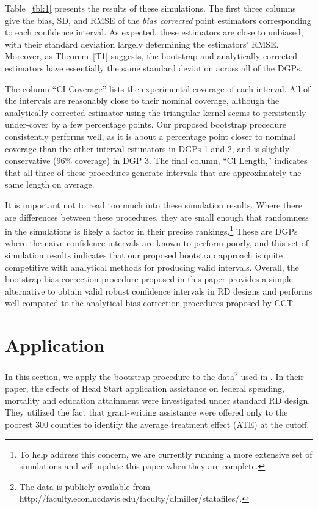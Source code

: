 \documentclass[12pt,fleqn]{article}
\begin{document}
Table~\ref{tbl:1} presents the results of these simulations. The first three
columns give the bias, SD, and RMSE of the \emph{bias corrected} point
estimators corresponding to each confidence interval.  As expected, these
estimators are close to unbiased, with their standard deviation largely
determining the estimators' RMSE. Moreover, as Theorem~\ref{T1} suggests, the
bootstrap and analytically-corrected estimators have essentially the same
standard deviation across all of the DGPs.

The column ``CI Coverage'' lists the experimental coverage of each interval.
All of the intervals are reasonably close to their nominal coverage, although
the analytically corrected estimator using the triangular kernel seems to
persistently under-cover by a few percentage points. Our proposed bootstrap
procedure consistently performs well, as it is about a percentage point closer
to nominal coverage than the other interval estimators in DGPs 1 and 2, and is
slightly conservative (96\% coverage) in DGP 3. The final column, ``CI Length,''
indicates that all three of these procedures generate intervals that are
approximately the same length on average.

It is important not to read too much into these simulation results. Where there
are differences between these procedures, they are small enough that randomness
in the simulations is likely a factor in their precise rankings.\footnote{%
  To help address this concern, we are currently running a more extensive set of
  simulations and will update this paper when they are complete.} %
These are DGPs where the naive confidence intervals are known to perform poorly,
and this set of simulation results indicates that our proposed bootstrap approach
is quite competitive with analytical methods for producing valid intervals.
Overall, the bootstrap bias-correction procedure proposed in this paper provides
a simple alternative to obtain valid robust confidence intervals in RD designs
and performs well compared to the analytical bias correction procedures proposed
by CCT.

\section{Application}\label{application}

In this section, we apply the bootstrap procedure to the data\footnote{The data is publicly available from http://faculty.econ.ucdavis.edu/faculty/dlmiller/statafiles/.} used in \cite{ludwig2007}. In their paper, the effects of Head Start application assistance on federal spending, mortality and education attainment were investigated under standard RD design. They utilized the fact that grant-writing assistance were offered only to the poorest 300 counties to identify the average treatment effect (ATE) at the cutoff.
\end{document}
